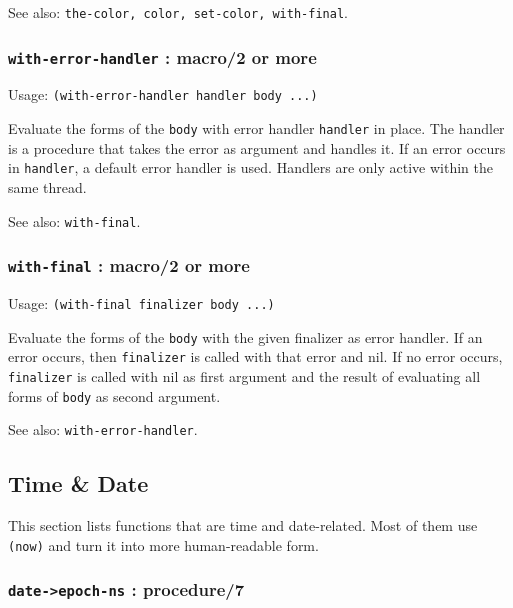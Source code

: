 \documentclass[
]{article}
\newcommand{\passthrough}[1]{#1}
\begin{document}
See also:
\passthrough{\lstinline!the-color, color, set-color, with-final!}.

\hypertarget{with-error-handler-macro2-or-more}{%
\subsubsection{\texorpdfstring{\texttt{with-error-handler} : macro/2 or
more}{with-error-handler : macro/2 or more}}\label{with-error-handler-macro2-or-more}}

Usage: \passthrough{\lstinline!(with-error-handler handler body ...)!}

Evaluate the forms of the \passthrough{\lstinline!body!} with error
handler \passthrough{\lstinline!handler!} in place. The handler is a
procedure that takes the error as argument and handles it. If an error
occurs in \passthrough{\lstinline!handler!}, a default error handler is
used. Handlers are only active within the same thread.

See also: \passthrough{\lstinline!with-final!}.

\hypertarget{with-final-macro2-or-more}{%
\subsubsection{\texorpdfstring{\texttt{with-final} : macro/2 or
more}{with-final : macro/2 or more}}\label{with-final-macro2-or-more}}

Usage: \passthrough{\lstinline!(with-final finalizer body ...)!}

Evaluate the forms of the \passthrough{\lstinline!body!} with the given
finalizer as error handler. If an error occurs, then
\passthrough{\lstinline!finalizer!} is called with that error and nil.
If no error occurs, \passthrough{\lstinline!finalizer!} is called with
nil as first argument and the result of evaluating all forms of
\passthrough{\lstinline!body!} as second argument.

See also: \passthrough{\lstinline!with-error-handler!}.

\hypertarget{time-date}{%
\subsection{Time \& Date}\label{time-date}}

This section lists functions that are time and date-related. Most of
them use \passthrough{\lstinline!(now)!} and turn it into more
human-readable form.

\hypertarget{date-epoch-ns-procedure7}{%
\subsubsection{\texorpdfstring{\texttt{date-\textgreater{}epoch-ns} :
procedure/7}{date-\textgreater epoch-ns : procedure/7}}\label{date-epoch-ns-procedure7}}
\end{document}
